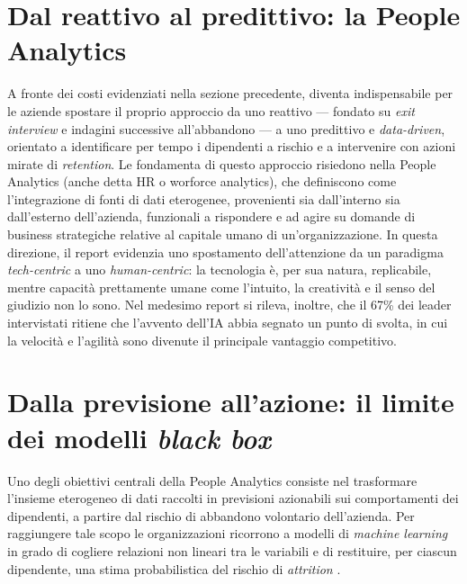 \section{Dal reattivo al predittivo: la People Analytics}
A fronte dei costi evidenziati nella sezione precedente, diventa indispensabile per le aziende spostare il proprio approccio da uno reattivo --- fondato su \textit{exit interview} e indagini successive all'abbandono --- a uno predittivo e \textit{data-driven}, orientato a identificare per tempo i dipendenti a rischio e a intervenire con azioni mirate di \textit{retention}.
Le fondamenta di questo approccio risiedono nella People Analytics (anche detta HR o worforce analytics), che \cite{Isson_Harriott_2016} definiscono come l'integrazione di fonti di dati eterogenee, provenienti sia dall'interno sia dall'esterno dell'azienda, funzionali a rispondere e ad agire su domande di business strategiche relative al capitale umano di un'organizzazione.
In questa direzione, il report \cite{deloitte2026trends} evidenzia uno spostamento dell'attenzione da un paradigma \textit{tech-centric} a uno \textit{human-centric}: la tecnologia è, per sua natura, replicabile, mentre capacità prettamente umane come l'intuito, la creatività e il senso del giudizio non lo sono.
Nel medesimo report si rileva, inoltre, che il 67\% dei leader intervistati ritiene che l'avvento dell'IA abbia segnato un punto di svolta, in cui la velocità e l'agilità sono divenute il principale vantaggio competitivo.

\section{Dalla previsione all'azione: il limite dei modelli \textit{black box}}
Uno degli obiettivi centrali della People Analytics consiste nel trasformare l'insieme eterogeneo di dati raccolti in previsioni azionabili sui comportamenti dei dipendenti, a partire dal rischio di abbandono volontario dell'azienda. Per raggiungere tale scopo le organizzazioni ricorrono a modelli di \textit{machine learning} in grado di cogliere relazioni non lineari tra le variabili e di restituire, per ciascun dipendente, una stima probabilistica del rischio di \textit{attrition} \cite{schweyer2018predictive}.

